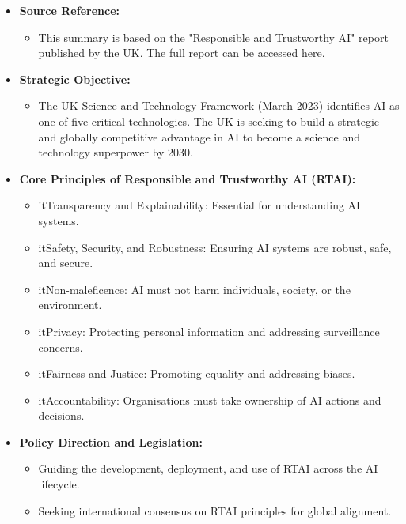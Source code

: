 \begin{itemize}
    \item \textbf{Source Reference:}
    \begin{itemize}
        \item This summary is based on the "Responsible and Trustworthy AI" report published by the UK. The full report can be accessed \href{https://iuk.ktn-uk.org/wp-content/uploads/2023/10/responsible-trustworthy-ai-report.pdf}{here}.
    \end{itemize}

    \item \textbf{Strategic Objective:}
    \begin{itemize}
        \item The UK Science and Technology Framework (March 2023) identifies AI as one of five critical technologies. The UK is seeking to build a strategic and globally competitive advantage in AI to become a science and technology superpower by 2030.
    \end{itemize}

    \item \textbf{Core Principles of Responsible and Trustworthy AI (RTAI):}
    \begin{itemize}
        \item it{Transparency and Explainability}: Essential for understanding AI systems.
        \item it{Safety, Security, and Robustness}: Ensuring AI systems are robust, safe, and secure.
        \item it{Non-maleficence}: AI must not harm individuals, society, or the environment.
        \item it{Privacy}: Protecting personal information and addressing surveillance concerns.
        \item it{Fairness and Justice}: Promoting equality and addressing biases.
        \item it{Accountability}: Organisations must take ownership of AI actions and decisions.
    \end{itemize}

    \item \textbf{Policy Direction and Legislation:}
    \begin{itemize}
        \item Guiding the development, deployment, and use of RTAI across the AI lifecycle.
        \item Seeking international consensus on RTAI principles for global alignment.
    \end{itemize}


\end{itemize}
